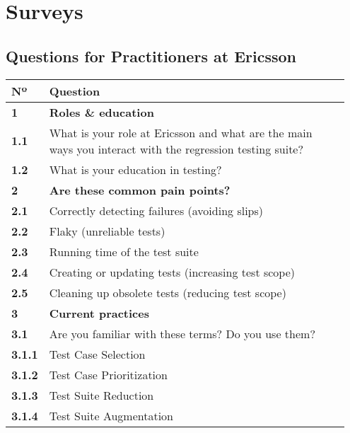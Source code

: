 \chapter{Surveys}\label{app:surveys}


\section{Questions for Practitioners at Ericsson}

\begin{table}[]
\centering
{}
\begin{tabular}{p{0.05\linewidth}p{0.9\linewidth}}
\toprule
\textbf{Nº} & \textbf{Question} \\
\midrule
\textbf{1} & \textbf{Roles \& education} \\
\textbf{1.1} & What is your role at Ericsson and what are the main ways you interact with the regression testing suite? \\
\textbf{1.2} & What is your education in testing? \\
\midrule
\textbf{2} & \textbf{Are these common pain points?} \\
\textbf{2.1} & Correctly detecting failures (avoiding slips) \\
\textbf{2.2} & Flaky (unreliable tests) \\
\textbf{2.3} & Running time of the test suite \\
\textbf{2.4} & Creating or updating tests (increasing test scope) \\
\textbf{2.5} & Cleaning up obsolete tests (reducing test scope) \\
\midrule
\textbf{3} & \textbf{Current practices} \\
\textbf{3.1} & Are you familiar with these terms? Do you use them? \\
\textbf{3.1.1} & Test Case Selection \\
\textbf{3.1.2} & Test Case Prioritization \\
\textbf{3.1.3} & Test Suite Reduction \\
\textbf{3.1.4} & Test Suite Augmentation \\

\end{tabular}
\end{table}

